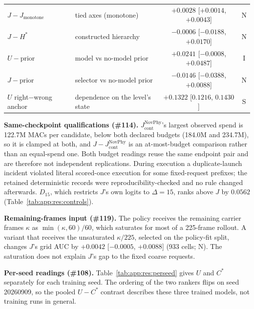 \begin{table}[h]
\begin{revblock}
\begin{tabular}{@{}llcc@{}}
$J-J_{\mathrm{monotone}}$ & tied axes (monotone) & $+0.0028$ [$+0.0014$, $+0.0043$] & N \\
$J-H^{*}$ & constructed hierarchy & $-0.0006$ [$-0.0188$, $+0.0170$] & N \\
$U-\text{prior}$ & model vs no-model prior & $+0.0241$ [$-0.0008$, $+0.0487$] & I \\
$J-\text{prior}$ & selector vs no-model prior & $-0.0146$ [$-0.0388$, $+0.0088$] & N \\
$U$ right$-$wrong anchor & dependence on the level's state & $+0.1322$ [$0.1216$, $0.1430$] & S \\
\bottomrule
\end{tabular}
\end{revblock}
\end{table}

\begin{revblock}
\textbf{Same-checkpoint qualifications (\#114).} $J_{\mathrm{cont}}^{\mathrm{NovPhy}}$'s largest observed spend is 122.7M MACs per candidate, below both declared budgets (184.0M and 234.7M), so it is clamped at both, and $J-J_{\mathrm{cont}}^{\mathrm{NovPhy}}$ is an at-most-budget comparison rather than an equal-spend one. Both budget readings reuse the same endpoint pair and are therefore not independent replications. During execution a duplicate-launch incident violated literal scored-once execution for some fixed-request prefixes; the retained deterministic records were reproducibility-checked and no rule changed afterwards. $D_{15}$, which restricts $J$'s own logits to $\Delta=15$, ranks above $J$ by $0.0562$ (Table~\ref{tab:app:res:controls}).

\textbf{Remaining-frames input (\#119).} The policy receives the remaining carrier frames $\kappa$ as $\min(\kappa,60)/60$, which saturates for most of a 225-frame rollout. A variant that receives the unsaturated $\kappa/225$, selected on the policy-fit split, changes $J$'s grid AUC by $+0.0042$ [$-0.0005$, $+0.0088$] (933 cells; N). The saturation does not explain $J$'s gap to the fixed coarse requests.

\textbf{Per-seed readings (\#108).} Table~\ref{tab:app:res:perseed} gives $U$ and $C^{*}$ separately for each training seed. The ordering of the two rankers flips on seed 20260909, so the pooled $U-C^{*}$ contrast describes these three trained models, not training runs in general.
\end{revblock}


